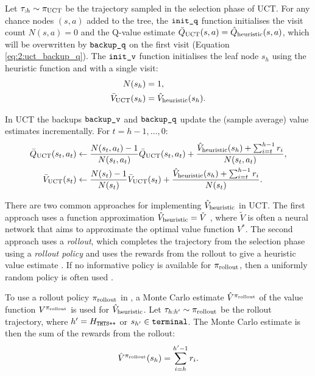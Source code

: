     Let $\tau_{:h}\sim{\pi_{{\textnormal{UCT}}}}$ be the trajectory sampled in the selection phase of UCT. For any chance nodes $(s,a)$ added to the tree, the ${\textnormal{\texttt{init\_q}}}$ function initialises the visit count $N(s,a)=0$ and the Q-value estimate ${\bar{Q}_{{\textnormal{UCT}}}}(s,a)={\hat{Q}_{\textnormal{heuristic}}}(s,a)$, which will be overwritten by ${\textnormal{\texttt{backup\_q}}}$ on the first visit (Equation \ref{eq:2:uct_backup_q}). The ${\textnormal{\texttt{init\_v}}}$ function initialises the leaf node $s_h$ using the heuristic function and with a single visit:
    \begin{align}
        N(s_h) &= 1, \\
        {\bar{V}_{{\textnormal{UCT}}}}(s_h) &= {\hat{V}_{\textnormal{heuristic}}}(s_h). \label{eq:2:uct_init_v}
    \end{align}
    
    In UCT the backups ${\textnormal{\texttt{backup\_v}}}$ and ${\textnormal{\texttt{backup\_q}}}$ update the (sample average) value estimates incrementally. For $t=h-1,\ldots,0$:
    \begin{align}
        {\bar{Q}_{{\textnormal{UCT}}}}(s_t,a_t) &\leftarrow 
            \frac{N(s_t,a_t)-1}{N(s_t,a_t)} {\bar{Q}_{{\textnormal{UCT}}}}(s_t,a_t) 
                + \frac{{\hat{V}_{\textnormal{heuristic}}}(s_h) + \sum_{i=t}^{h-1} r_i}{N(s_t,a_t)} , \label{eq:2:uct_backup_q} \\
        {\bar{V}_{{\textnormal{UCT}}}}(s_t) &\leftarrow 
            \frac{N(s_t)-1}{N(s_t)} {\bar{V}_{{\textnormal{UCT}}}}(s_t) 
                + \frac{{\hat{V}_{\textnormal{heuristic}}}(s_h) + \sum_{i=t}^{h-1} r_i}{N(s_t)} . \label{eq:2:uct_backup_v} 
    \end{align}  

    There are two common approaches for implementing ${\hat{V}_{\textnormal{heuristic}}}$ in UCT. The first approach uses a function approximation ${\hat{V}_{\textnormal{heuristic}}}=\tilde{V}$ \cite{alpha_go_zero,alpha_zero,a0c}, where $\tilde{V}$ is often a neural network that aims to approximate the optimal value function $V^*$. The second approach uses a \textit{rollout}, which completes the trajectory from the selection phase using a \textit{rollout policy} and uses the rewards from the rollout to give a heuristic value estimate \cite{mcts_survey,offlineonlineuct,prost,bus}. If no informative policy is available for ${\pi_{{\textnormal{rollout}}}}$, then a uniformly random policy is often used \cite{mcts_survey,rand_mc_est_orig}. 
    
    To use a rollout policy ${\pi_{{\textnormal{rollout}}}}$ in \thtspp, a Monte Carlo estimate $\hat{V}^{{\pi_{{\textnormal{rollout}}}}}$ of the value function $V^{{\pi_{{\textnormal{rollout}}}}}$ is used for ${\hat{V}_{\textnormal{heuristic}}}$. Let $\tau_{h:h'}\sim{\pi_{{\textnormal{rollout}}}}$ be the rollout trajectory, where $h'=H_{{\textnormal{\texttt{THTS++}}}}$ or $s_{h'}\in{\textnormal{\texttt{terminal}}}$. The Monte Carlo estimate is then the sum of the rewards from the rollout:
    \begin{align}
        \hat{V}^{{\pi_{{\textnormal{rollout}}}}}(s_h) = \sum_{i=h}^{h'-1} r_i. \label{eq:2:rollout_value_estimate}
    \end{align}












